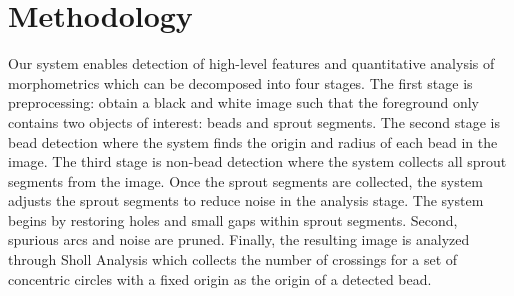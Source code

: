 \documentclass{sig-alternate}
\begin{document}


\section{Methodology} %
\label{sec:Methodology}




	Our system enables detection of high-level features and quantitative
	analysis of morphometrics which can be decomposed into four stages.
	The first stage is preprocessing: obtain a black and white image such
	that the foreground only contains two objects of interest: beads and
	sprout segments. The second stage is bead detection where the system
	finds the origin and radius of each bead in the image.  The third
	stage is non-bead detection where the system collects all sprout
	segments from the image. Once the sprout segments are collected, the
	system adjusts the sprout segments to reduce noise in the analysis
	stage. The system begins by restoring holes and small gaps within
	sprout segments. Second, spurious arcs and noise are pruned. Finally,
	the resulting image is analyzed through Sholl Analysis which collects
	the number of crossings for a set of concentric circles with a fixed
	origin as the origin of a detected bead.
\end{document}

